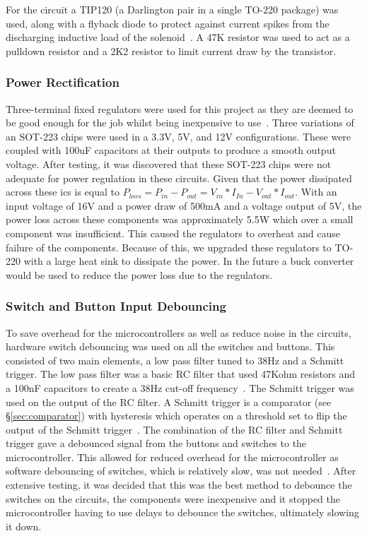 \documentclass [12pt]{article}
\begin{document}
For the circuit a TIP120 (a Darlington pair in a single TO-220 package) was used, along with a flyback diode to protect against current spikes from the discharging inductive load of the solenoid~\cite{artofe_inductive_load,artofe_loads_and_doides}. A 47K resistor was used to act as a pulldown resistor and a 2K2 resistor to limit current draw by the transistor.

\subsubsection{Power Rectification}

Three-terminal fixed regulators were used for this project as they are deemed to be good enough for the job whilst being inexpensive to use~\cite{artofe_three_term_regs}. Three variations of an SOT-223 chips were used in a 3.3V, 5V, and 12V configurations. These were coupled with 100uF capacitors at their outputs to produce a smooth output voltage.
After testing, it was discovered that these SOT-223 chips were not adequate for power regulation in these circuits. Given that the power dissipated across these \gls{ic}s is equal to $P_{loss} = P_{in}-P_{out}=V_{in}*I_{In}-V_{out}*I_{out}$. With an input voltage of 16V and a power draw of 500mA and a voltage output of 5V, the power loss across these components was approximately 5.5W which over a small component was insufficient. This caused the regulators to overheat and cause failure of the components. Because of this, we upgraded these regulators to TO-220 with a large heat sink to dissipate the power. In the future a buck converter would be used to reduce the power loss due to the regulators.

\subsubsection{Switch and Button Input Debouncing}
To save overhead for the microcontrollers as well as reduce noise in the circuits, hardware switch debouncing was used on all the switches and buttons. This consisted of two main elements, a low pass filter tuned to 38Hz and a Schmitt trigger. The low pass filter was a basic RC filter that used 47Kohm resistors and a 100nF capacitors to create a 38Hz cut-off frequency~\cite{artofe_RC_circuit}. The Schmitt trigger was used on the output of the RC filter. A Schmitt trigger is a comparator (see §\ref{sec:comparator}) with hysteresis which operates on a threshold set to flip the output of the Schmitt trigger~\cite{parr1981schmitt}. The combination of the RC filter and Schmitt trigger gave a debounced signal from the buttons and switches to the microcontroller. This allowed for reduced overhead for the microcontroller as software debouncing of switches, which is relatively slow, was not needed~\cite{eejournal-switchdebounce}. After extensive testing, it was decided that this was the best method to debounce the switches on the circuits, the components were inexpensive and it stopped the microcontroller having to use delays to debounce the switches, ultimately slowing it down.
\end{document}
